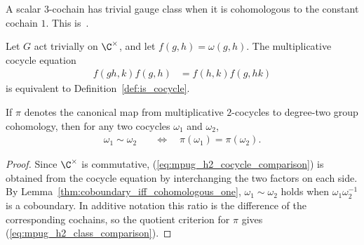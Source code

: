 \begin{definition}
    \label{def:mpug_trivial_gauge_class}
    \leanok
    A scalar $3$-cochain has trivial gauge class when it is cohomologous to
    the constant cochain $1$.
    This is~\cite[``Trivial scalar gauge class'']{QICLean2026Blueprint}.
\end{definition}

\begin{lemma}
    \label{thm:mpug_h2_trivial_coefficients}
    \leanok
    Let $G$ act trivially on $\C^\times$, and let
    $f(g,h)=\omega(g,h)$. The multiplicative cocycle equation
    \begin{align}
        f(gh,k)f(g,h)
         & =f(h,k)f(g,hk)
        \label{eq:mpug_h2_cocycle_comparison}
    \end{align}
    is equivalent to Definition~\ref{def:is_cocycle}.

    If $\pi$ denotes the canonical map from multiplicative $2$-cocycles to
    degree-two group cohomology, then for any two cocycles $\omega_1$ and
    $\omega_2$,
    \begin{align}
        \omega_1\sim\omega_2
         & \quad\Longleftrightarrow\quad
        \pi(\omega_1)=\pi(\omega_2).
        \label{eq:mpug_h2_class_comparison}
    \end{align}
\end{lemma}

\begin{proof}\leanok
    Since $\C^\times$ is commutative,
    (\ref{eq:mpug_h2_cocycle_comparison}) is obtained from the cocycle
    equation by interchanging the two factors on each side.
    By Lemma~\ref{thm:coboundary_iff_cohomologous_one},
    $\omega_1\sim\omega_2$ holds when $\omega_1\omega_2^{-1}$ is a
    coboundary. In additive notation this ratio is the difference of the
    corresponding cochains, so the quotient criterion for $\pi$ gives
    (\ref{eq:mpug_h2_class_comparison}).
\end{proof}

